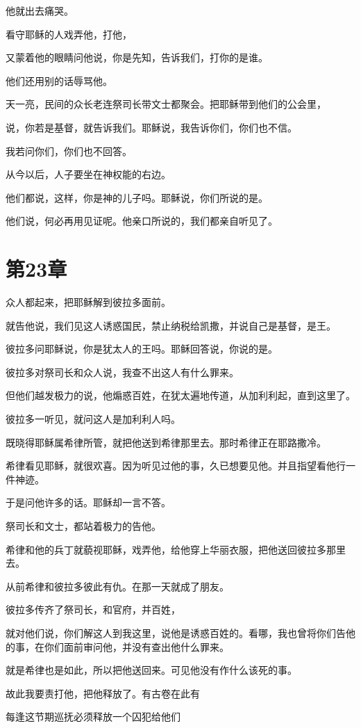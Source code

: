 \documentclass[12pt,oneside]{book}
\begin{document}
他就出去痛哭。

看守耶稣的人戏弄他，打他，

又蒙着他的眼睛问他说，你是先知，告诉我们，打你的是谁。

他们还用别的话辱骂他。

天一亮，民间的众长老连祭司长带文士都聚会。把耶稣带到他们的公会里，

说，你若是基督，就告诉我们。耶稣说，我告诉你们，你们也不信。

我若问你们，你们也不回答。

从今以后，人子要坐在神权能的右边。

他们都说，这样，你是神的儿子吗。耶稣说，你们所说的是。

他们说，何必再用见证呢。他亲口所说的，我们都亲自听见了。

\chapter{第23章}
众人都起来，把耶稣解到彼拉多面前。

就告他说，我们见这人诱惑国民，禁止纳税给凯撒，并说自己是基督，是王。

彼拉多问耶稣说，你是犹太人的王吗。耶稣回答说，你说的是。

彼拉多对祭司长和众人说，我查不出这人有什么罪来。

但他们越发极力的说，他煽惑百姓，在犹太遍地传道，从加利利起，直到这里了。

彼拉多一听见，就问这人是加利利人吗。

既晓得耶稣属希律所管，就把他送到希律那里去。那时希律正在耶路撒冷。

希律看见耶稣，就很欢喜。因为听见过他的事，久已想要见他。并且指望看他行一件神迹。

于是问他许多的话。耶稣却一言不答。

祭司长和文士，都站着极力的告他。

希律和他的兵丁就藐视耶稣，戏弄他，给他穿上华丽衣服，把他送回彼拉多那里去。

从前希律和彼拉多彼此有仇。在那一天就成了朋友。

彼拉多传齐了祭司长，和官府，并百姓，

就对他们说，你们解这人到我这里，说他是诱惑百姓的。看哪，我也曾将你们告他的事，在你们面前审问他，并没有查出他什么罪来。

就是希律也是如此，所以把他送回来。可见他没有作什么该死的事。

故此我要责打他，把他释放了。有古卷在此有

每逢这节期巡抚必须释放一个囚犯给他们
\end{document}
